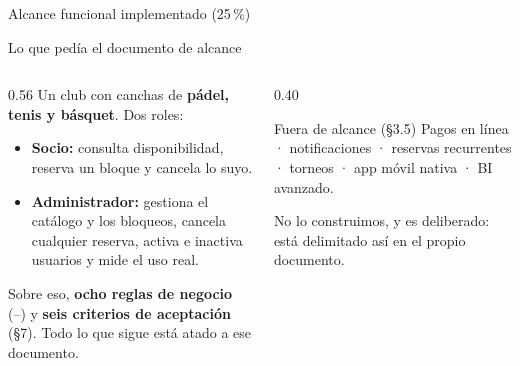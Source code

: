 %
%

%
       {Alcance funcional implementado (25\,\%)}

\begin{frame}{Lo que pedía el documento de alcance}
  \begin{columns}[T]
    \begin{column}{0.56\textwidth}
      Un club con canchas de \textbf{pádel, tenis y básquet}. Dos roles:
      \begin{itemize}\footnotesize
        \item \textbf{Socio:} consulta disponibilidad, reserva un bloque y
              cancela lo suyo.
        \item \textbf{Administrador:} gestiona el catálogo y los bloqueos,
              cancela cualquier reserva, activa e inactiva usuarios y mide el
              uso real.
      \end{itemize}

      \vspace{4pt}
      {\footnotesize Sobre eso, \textbf{ocho reglas de negocio}
      (--) y \textbf{seis criterios de aceptación} (§7).
      Todo lo que sigue está atado a ese documento.}
    \end{column}
    \begin{column}{0.40\textwidth}
      \begin{block}{Fuera de alcance (§3.5)}
        \footnotesize
        Pagos en línea · notificaciones · reservas recurrentes · torneos ·
        app móvil nativa · BI avanzado.
      \end{block}
      {\scriptsize\color{textoSuave} No lo construimos, y es deliberado:
      está delimitado así en el propio documento.}
    \end{column}
  \end{columns}
\end{frame}
